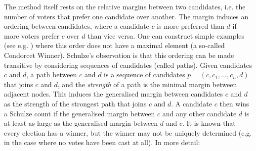 \documentclass[compsoc,conference,a4paper,10pt,times]{IEEEtran}
\begin{document}
    
    The  method itself rests on the relative margins between two
    candidates, i.e. the number of voters that prefer one candidate
    over another. The margin induces an ordering between candidates,
    where a candidate $c$ is more preferred than $d$ if more voters
    prefer $c$ over $d$ than vice versa. One can construct simple
    examples (see e.g. \cite{Rivest:2010:OSW}) where this order does
    not have a maximal element (a so-called Condorcet Winner).
    Schulze’s observation is that this ordering can be made
    transitive by considering sequences of candidates (called
    paths).  Given candidates $c$ and $d$, a path between $c$ and
    $d$ is a
    sequence of candidates $p= (c,c_{1}, \dots ,c_{n},d)$ that joins
    $c$ and $d$, and the \emph{strength} of a path is the minimal margin
    between adjacent nodes. This induces the generalised margin
    between candidates $c$ and $d$ as the strength of the strongest path
    that joins $c$ and $d$.  A candidate $c$ then wins a Schulze count if
    the generalised margin between $c$ 
    and any other candidate $d$ is at least as large as the
    generalised margin between $d$ and $c$. It is known that every
    election has a winner, but the winner may not be uniquely
    determined (e.g. in the case where no votes have been cast at
    all).
    In more detail:
\end{document}
